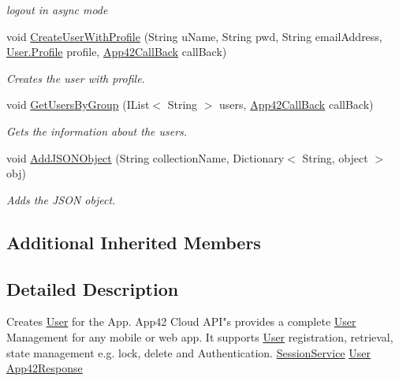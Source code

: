 \begin{DoxyCompactItemize}
\begin{DoxyCompactList}\small\item\em logout in async mode \end{DoxyCompactList}\item 
void \hyperlink{classcom_1_1shephertz_1_1app42_1_1paas_1_1sdk_1_1csharp_1_1user_1_1_user_service_ab708fbc53292bfa1f19469bb968ebc85}{Create\+User\+With\+Profile} (String u\+Name, String pwd, String email\+Address, \hyperlink{classcom_1_1shephertz_1_1app42_1_1paas_1_1sdk_1_1csharp_1_1user_1_1_user_1_1_profile}{User.\+Profile} profile, \hyperlink{interfacecom_1_1shephertz_1_1app42_1_1paas_1_1sdk_1_1csharp_1_1_app42_call_back}{App42\+Call\+Back} call\+Back)
\begin{DoxyCompactList}\small\item\em Creates the user with profile. \end{DoxyCompactList}\item 
void \hyperlink{classcom_1_1shephertz_1_1app42_1_1paas_1_1sdk_1_1csharp_1_1user_1_1_user_service_ab0ac51086e659b281634dc60fb0e9976}{Get\+Users\+By\+Group} (I\+List$<$ String $>$ users, \hyperlink{interfacecom_1_1shephertz_1_1app42_1_1paas_1_1sdk_1_1csharp_1_1_app42_call_back}{App42\+Call\+Back} call\+Back)
\begin{DoxyCompactList}\small\item\em Gets the information about the users. \end{DoxyCompactList}\item 
void \hyperlink{classcom_1_1shephertz_1_1app42_1_1paas_1_1sdk_1_1csharp_1_1user_1_1_user_service_a22240e310a21a6e8e0d126dcee5c9ba0}{Add\+J\+S\+O\+N\+Object} (String collection\+Name, Dictionary$<$ String, object $>$ obj)
\begin{DoxyCompactList}\small\item\em Adds the J\+S\+O\+N object. \end{DoxyCompactList}\end{DoxyCompactItemize}
\subsection*{Additional Inherited Members}


\subsection{Detailed Description}
Creates \hyperlink{classcom_1_1shephertz_1_1app42_1_1paas_1_1sdk_1_1csharp_1_1user_1_1_user}{User} for the App. App42 Cloud A\+P\+I"s provides a complete \hyperlink{classcom_1_1shephertz_1_1app42_1_1paas_1_1sdk_1_1csharp_1_1user_1_1_user}{User} Management for any mobile or web app. It supports \hyperlink{classcom_1_1shephertz_1_1app42_1_1paas_1_1sdk_1_1csharp_1_1user_1_1_user}{User} registration, retrieval, state management e.\+g. lock, delete and Authentication. \hyperlink{}{Session\+Service} \hyperlink{classcom_1_1shephertz_1_1app42_1_1paas_1_1sdk_1_1csharp_1_1user_1_1_user_service}{User} \hyperlink{classcom_1_1shephertz_1_1app42_1_1paas_1_1sdk_1_1csharp_1_1_app42_response}{App42\+Response} 



